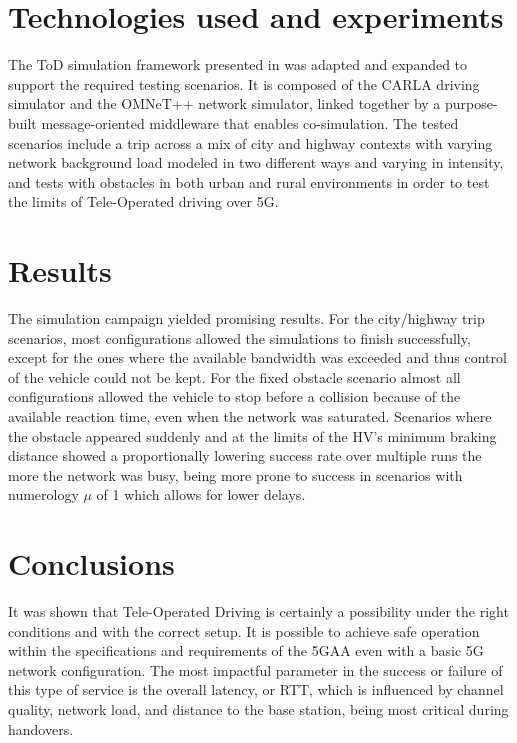 \documentclass[12pt]{article}
\begin{document}
\section{Technologies used and experiments}
The ToD simulation framework presented in \cite{valeriopaper} was adapted and expanded to support the required testing scenarios. It is composed of the CARLA driving simulator and the OMNeT++ network simulator, linked together by a purpose-built message-oriented middleware that enables co-simulation.
The tested scenarios include a trip across a mix of city and highway contexts with varying network background load modeled in two different ways and varying in intensity, and tests with obstacles in both urban and rural environments in order to test the limits of Tele-Operated driving over 5G.

\section{Results}
The simulation campaign yielded promising results. For the city/highway trip scenarios, most configurations allowed the simulations to finish successfully, except for the ones where the available bandwidth was exceeded and thus control of the vehicle could not be kept. For the fixed obstacle scenario almost all configurations allowed the vehicle to stop before a collision because of the available reaction time, even when the network was saturated.
Scenarios where the obstacle appeared suddenly and at the limits of the HV's minimum braking distance showed a proportionally lowering success rate over multiple runs the more the network was busy, being more prone to success in scenarios with numerology $\mu$ of 1 which allows for lower delays.

\section{Conclusions}
It was shown that Tele-Operated Driving is certainly a possibility under the right conditions and with the correct setup. It is possible to achieve safe operation within the specifications and requirements of the 5GAA even with a basic 5G network configuration. The most impactful parameter in the success or failure of this type of service is the overall latency, or RTT, which is influenced by channel quality, network load, and distance to the base station, being most critical during handovers.

\printbibliography
\end{document}
